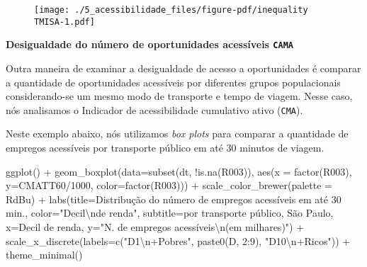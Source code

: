 \documentclass[
  letterpaper,
  DIV=11,
  numbers=noendperiod]{scrreprt}
\newenvironment{Shaded}{\begin{snugshade}}{\end{snugshade}}
\newcommand{\AttributeTok}[1]{\textcolor[rgb]{0.40,0.45,0.13}{#1}}
\newcommand{\DecValTok}[1]{\textcolor[rgb]{0.68,0.00,0.00}{#1}}
\newcommand{\FunctionTok}[1]{\textcolor[rgb]{0.28,0.35,0.67}{#1}}
\newcommand{\NormalTok}[1]{\textcolor[rgb]{0.00,0.23,0.31}{#1}}
\newcommand{\SpecialCharTok}[1]{\textcolor[rgb]{0.37,0.37,0.37}{#1}}
\newcommand{\StringTok}[1]{\textcolor[rgb]{0.13,0.47,0.30}{#1}}
\begin{document}
\begin{figure}[H]

{\centering \texttt{[image: ./5\_acessibilidade\_files/figure-pdf/inequality TMISA-1.pdf]}

}

\end{figure}

\textbf{Desigualdade do número de oportunidades acessíveis
\texttt{CAMA}}

Outra maneira de examinar a desigualdade de acesso a oportunidades é
comparar a quantidade de oportunidades acessíveis por diferentes grupos
populacionais considerando-se um mesmo modo de transporte e tempo de
viagem. Nesse caso, nós analisamos o Indicador de acessibilidade
cumulativo ativo (\texttt{CMA}).

Neste exemplo abaixo, nós utilizamos \emph{box plots} para comparar a
quantidade de empregos acessíveis por transporte público em até 30
minutos de viagem.

\begin{Shaded}
\begin{Highlighting}[]
\FunctionTok{ggplot}\NormalTok{() }\SpecialCharTok{+}
  \FunctionTok{geom\_boxplot}\NormalTok{(}\AttributeTok{data=}\FunctionTok{subset}\NormalTok{(dt, }\SpecialCharTok{!}\FunctionTok{is.na}\NormalTok{(R003)),}
               \FunctionTok{aes}\NormalTok{(}\AttributeTok{x =} \FunctionTok{factor}\NormalTok{(R003), }\AttributeTok{y=}\NormalTok{CMATT60}\SpecialCharTok{/}\DecValTok{1000}\NormalTok{, }\AttributeTok{color=}\FunctionTok{factor}\NormalTok{(R003))) }\SpecialCharTok{+}
  \FunctionTok{scale\_color\_brewer}\NormalTok{(}\AttributeTok{palette =} \StringTok{\textquotesingle{}RdBu\textquotesingle{}}\NormalTok{) }\SpecialCharTok{+}
  \FunctionTok{labs}\NormalTok{(}\AttributeTok{title=}\StringTok{\textquotesingle{}Distribução do número de empregos acessíveis em até 30 min.\textquotesingle{}}\NormalTok{, }\AttributeTok{color=}\StringTok{"Decil}\SpecialCharTok{\textbackslash{}n}\StringTok{de renda"}\NormalTok{,}
       \AttributeTok{subtitle=}\StringTok{\textquotesingle{}por transporte público, São Paulo\textquotesingle{}}\NormalTok{,}
       \AttributeTok{x=}\StringTok{\textquotesingle{}Decil de renda\textquotesingle{}}\NormalTok{, }\AttributeTok{y=}\StringTok{"N. de empregos acessíveis}\SpecialCharTok{\textbackslash{}n}\StringTok{(em milhares)"}\NormalTok{) }\SpecialCharTok{+}
  \FunctionTok{scale\_x\_discrete}\NormalTok{(}\AttributeTok{labels=}\FunctionTok{c}\NormalTok{(}\StringTok{"D1}\SpecialCharTok{\textbackslash{}n}\StringTok{+Pobres"}\NormalTok{, }\FunctionTok{paste0}\NormalTok{(}\StringTok{\textquotesingle{}D\textquotesingle{}}\NormalTok{, }\DecValTok{2}\SpecialCharTok{:}\DecValTok{9}\NormalTok{), }\StringTok{"D10}\SpecialCharTok{\textbackslash{}n}\StringTok{+Ricos"}\NormalTok{)) }\SpecialCharTok{+}
  \FunctionTok{theme\_minimal}\NormalTok{()}
\end{Highlighting}
\end{Shaded}
\end{document}
